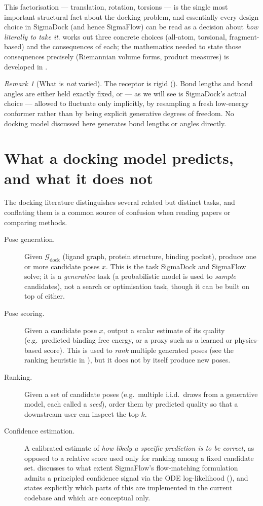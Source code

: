 \documentclass[11pt,a4paper]{report}
\theoremstyle{definition}
\theoremstyle{remark}
\newtheorem{remark}[remark]{Remark}
\begin{document}
This factorisation --- translation, rotation, torsions --- is the single most
important structural fact about the docking problem, and essentially every
design choice in SigmaDock (and hence SigmaFlow) can be read as a decision
about \emph{how literally to take it}.  works
out three concrete choices (all-atom, torsional, fragment-based) and the
consequences of each; the mathematics needed to state those consequences
precisely (Riemannian volume forms, product measures) is developed in
.

\begin{remark}[What is \emph{not} varied]
The receptor is rigid (). Bond lengths and bond angles are
either held exactly fixed, or --- as we will see is SigmaDock's actual
choice --- allowed to fluctuate only implicitly, by resampling a fresh
low-energy conformer rather than by being explicit generative degrees of
freedom. No docking model discussed here generates bond lengths or angles
directly.
\end{remark}

\section{What a docking model predicts, and what it does not}
\label{sec:docking-tasks}

The docking literature distinguishes several related but distinct tasks,
and conflating them is a common source of confusion when reading papers or
comparing methods.

\begin{description}
\item[Pose generation.] Given $\mathcal G_{\mathrm{dock}}$ (ligand graph,
protein structure, binding pocket), produce one or more candidate poses $x$.
This is the task SigmaDock and SigmaFlow solve; it is a \emph{generative}
task (a probabilistic model is used to \emph{sample} candidates), not a
search or optimisation task, though it can be built on top of either.
\item[Pose scoring.] Given a candidate pose $x$, output a scalar estimate of
its quality (e.g.\ predicted binding free energy, or a proxy such as a
learned or physics-based score). This is used to \emph{rank} multiple
generated poses (see the ranking heuristic in
), but it does not by itself produce new poses.
\item[Ranking.] Given a set of candidate poses (e.g.\ multiple i.i.d.\ draws
from a generative model, each called a \emph{seed}), order them by predicted
quality so that a downstream user can inspect the top-$k$.
\item[Confidence estimation.] A calibrated estimate of \emph{how likely a
specific prediction is to be correct}, as opposed to a relative score used
only for ranking among a fixed candidate set.  discusses
to what extent SigmaFlow's flow-matching formulation admits a
principled confidence signal via the ODE log-likelihood
(), and states explicitly which parts of
this are implemented in the current codebase and which are conceptual only.
\end{description}
\end{document}
